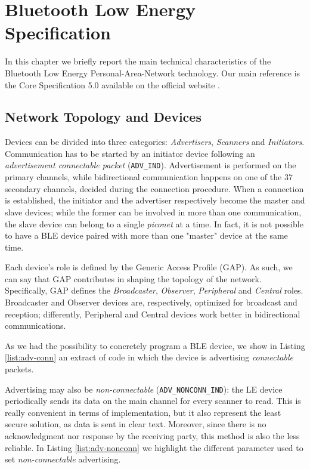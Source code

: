 \chapter{Bluetooth Low Energy Specification}
\label{chapter2}
\thispagestyle{empty}

\noindent In this chapter we briefly report the main technical characteristics of the Bluetooth Low Energy Personal-Area-Network technology. Our main reference is the Core Specification 5.0 available on the official website \cite{bt-core-specs}. 

\section{Network Topology and Devices}
Devices can be divided into three categories: \textit{Advertisers}, \textit{Scanners} and \textit{Initiators}. Communication has to be started by an initiator device following an \textit{advertisement connectable packet} (\texttt{ADV\_IND}). Advertisement is performed on the primary channels, while bidirectional communication happens on one of the 37 secondary channels, decided during the connection procedure. When a connection is established, the initiator and the advertiser respectively become the master and slave devices; while the former can be involved in more than one communication, the slave device can belong to a single \textit{piconet} at a time. In fact, it is not possible to have a BLE device paired with more than one "master" device at the same time.

Each device's role is defined by the Generic Access Profile (GAP). As such, we can say that GAP contributes in shaping the topology of the network. Specifically, GAP defines the \textit{Broadcaster}, \textit{Observer}, \textit{Peripheral} and \textit{Central} roles. Broadcaster and Observer devices are, respectively, optimized for broadcast and reception; differently, Peripheral and Central devices work better in bidirectional communications.

As we had the possibility to concretely program a BLE device, we show in Listing \ref{list:adv-conn} an extract of code in which the device is advertising \textit{connectable} packets.


Advertising may also be \textit{non-connectable} (\texttt{ADV\_NONCONN\_IND}): the LE device periodically sends its data on the main channel for every scanner to read. This is really convenient in terms of implementation, but it also represent the least secure solution, as data is sent in clear text. Moreover, since there is no acknowledgment nor response by the receiving party, this method is also the less reliable. In Listing \ref{list:adv-nonconn} we highlight the different parameter used to set \textit{non-connectable} advertising.


